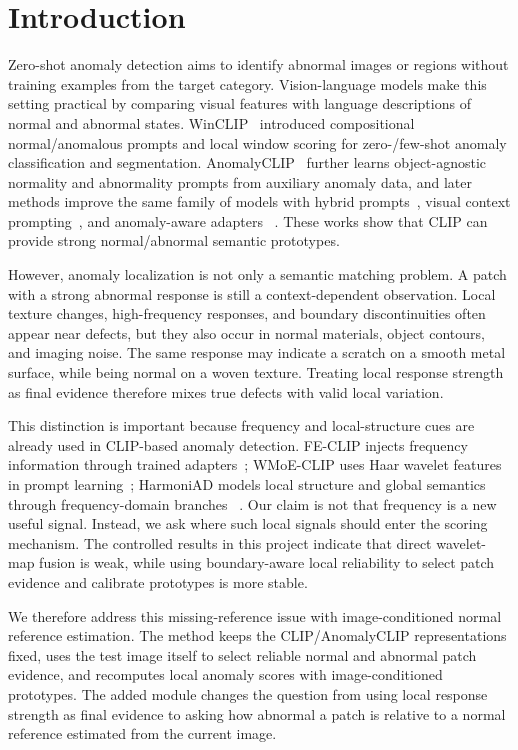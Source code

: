 \section{Introduction}
\label{sec:introduction}

Zero-shot anomaly detection aims to identify abnormal images or regions without
training examples from the target category. Vision-language models make this
setting practical by comparing visual features with language descriptions of
normal and abnormal states. WinCLIP~\cite{jeong2023winclip} introduced
compositional normal/anomalous prompts and local window scoring for
zero-/few-shot anomaly classification and segmentation. AnomalyCLIP~
\cite{zhou2024anomalyclip} further learns object-agnostic normality and
abnormality prompts from auxiliary anomaly data, and later methods improve the
same family of models with hybrid prompts~\cite{cao2024adaclip}, visual
context prompting~\cite{qu2024vcpclip}, and anomaly-aware adapters~
\cite{ma2025aaclip}. These works show that CLIP can provide strong
normal/abnormal semantic prototypes.

However, anomaly localization is not only a semantic matching problem. A patch
with a strong abnormal response is still a context-dependent observation. Local
texture changes, high-frequency responses, and boundary discontinuities often
appear near defects, but they also occur in normal materials, object contours,
and imaging noise. The same response may indicate a scratch on a smooth metal
surface, while being normal on a woven texture. Treating local response strength
as final evidence therefore mixes true defects with valid local variation.

This distinction is important because frequency and local-structure cues are
already used in CLIP-based anomaly detection. FE-CLIP injects frequency
information through trained adapters~\cite{gong2025feclip}; WMoE-CLIP uses
Haar wavelet features in prompt learning~\cite{chen2026wmoeclip}; HarmoniAD
models local structure and global semantics through frequency-domain branches~
\cite{zhang2026harmoniad}. Our claim is not that frequency is a new useful
signal. Instead, we ask where such local signals should enter the scoring
mechanism. The controlled results in this project indicate that direct
wavelet-map fusion is weak, while using boundary-aware local reliability to
select patch evidence and calibrate prototypes is more stable.

We therefore address this missing-reference issue with
image-conditioned normal reference estimation. The method keeps the
CLIP/AnomalyCLIP representations fixed, uses the test image itself to select
reliable normal and abnormal patch evidence, and recomputes local anomaly
scores with image-conditioned prototypes. The added module changes the
question from using local response strength as final evidence to asking how
abnormal a patch is relative to a normal reference estimated from the current
image.

